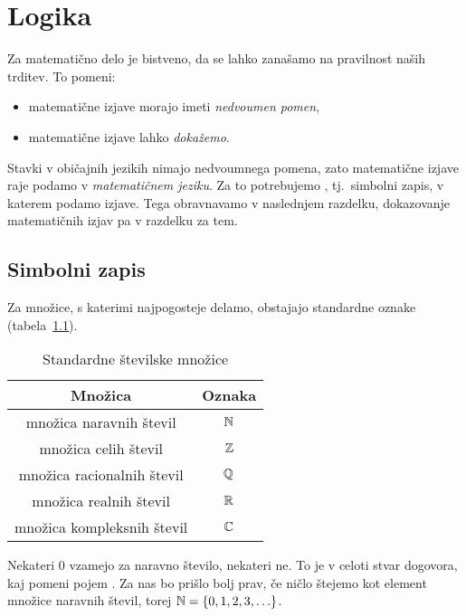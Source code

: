 \chapter{Logika}\label{POGLAVJE: Logika}

	Za matematično delo je bistveno, da se lahko zanašamo na pravilnost naših trditev. To pomeni:
	\begin{itemize}
		\item
			matematične izjave morajo imeti \emph{nedvoumen pomen},
		\item
			matematične izjave lahko \emph{dokažemo}.
	\end{itemize}
	
	Stavki v običajnih jezikih nimajo nedvoumnega pomena, zato matematične izjave raje podamo v \emph{matematičnem jeziku}. Za to potrebujemo , tj.~simbolni zapis, v katerem podamo izjave. Tega obravnavamo v naslednjem razdelku, dokazovanje matematičnih izjav pa v razdelku za tem.
	
	\section{Simbolni zapis}\label{RAZDELEK: Simbolni zapis}
	
		
		Za množice, s katerimi najpogosteje delamo, obstajajo standardne oznake (tabela~\ref{TABELA: Standardne številske množice}).
		
		\begin{table}[!ht]
			\centering
			\begin{tabular}{|cc|}
				\hline
				\textbf{Množica} & \textbf{Oznaka} \\
				\hline
				množica naravnih števil & $\mathbb{N}$ \\
				množica celih števil & $\mathbb{Z}$ \\
				množica racionalnih števil & $\mathbb{Q}$ \\
				množica realnih števil & $\mathbb{R}$ \\
				množica kompleksnih števil & $\mathbb{C}$ \\
				\hline
			\end{tabular}
			\caption{Standardne številske množice}\label{TABELA: Standardne številske množice}
		\end{table}
		
		Nekateri $0$ vzamejo za naravno število, nekateri ne. To je v celoti stvar dogovora, kaj pomeni pojem . Za nas bo prišlo bolj prav, če ničlo štejemo kot element množice naravnih števil, torej $\NN = \set{0, 1, 2, 3, \ldots}$.
		
